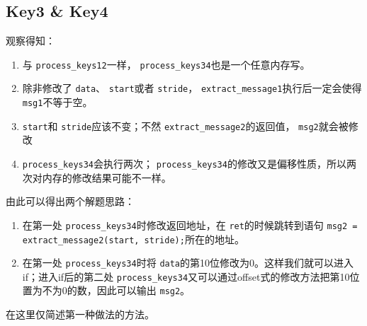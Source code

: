 \documentclass[a4pper,12pt,onecolumn]{article}
\begin{document}
\subsection{Key3 \& Key4}

观察得知：

\begin{enumerate}
    \item 与 \texttt{process\_keys12}一样， \texttt{process\_keys34}也是一个任意内存写。
    \item 除非修改了 \texttt{data}、 \texttt{start}或者 \texttt{stride}， \texttt{extract\_message1}执行后一定会使得 \texttt{msg1}不等于空。
    \item  \texttt{start}和 \texttt{stride}应该不变；不然 \texttt{extract\_message2}的返回值， \texttt{msg2}就会被修改
    \item  \texttt{process\_keys34}会执行两次； \texttt{process\_keys34}的修改又是偏移性质，所以两次对内存的修改结果可能不一样。
\end{enumerate}

由此可以得出两个解题思路：

\begin{enumerate}
    \item 在第一处 \texttt{process\_keys34}时修改返回地址，在 \texttt{ret}的时候跳转到语句 \texttt{msg2 = extract\_message2(start, stride);}所在的地址。
    \item 在第一处 \texttt{process\_keys34}时将 \texttt{data}的第10位修改为0。这样我们就可以进入if；进入if后的第二处 \texttt{process\_keys34}又可以通过offset式的修改方法把第10位置为不为0的数，因此可以输出 \texttt{msg2}。
\end{enumerate}

在这里仅简述第一种做法的方法。
\end{document}
